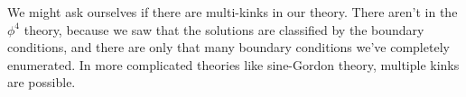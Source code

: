 \documentclass[a4paper]{article}
\begin{document}
%
%
%
%
%
%
%

We might ask ourselves if there are multi-kinks in our theory. There aren't in the $\phi^4$ theory, because we saw that the solutions are classified by the boundary conditions, and there are only that many boundary conditions we've completely enumerated. In more complicated theories like sine-Gordon theory, multiple kinks are possible.
\end{document}
